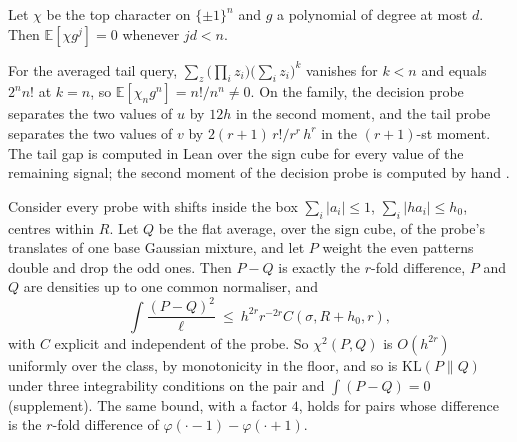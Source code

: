 \begin{theorem}
\label{thm:vanish}
Let $\chi$ be the top character on $\{\pm1\}^{n}$ and $g$ a polynomial of degree at most $d$.
Then $\mathbb{E}[\chi g^{j}]=0$ whenever $jd<n$.
\end{theorem}


\begin{theorem}[Attainment]
\label{thm:attain}
For the averaged tail query, $\sum_{z}\bigl(\prod_{i}z_{i}\bigr)\bigl(\sum_{i}z_{i}\bigr)^{k}$
vanishes for $k<n$ and equals $2^{n}n!$ at $k=n$, so $\mathbb{E}[\chi_{n}g^{n}]=n!/n^{n}\ne0$. On
the family, the decision probe separates the two values of $u$ by $12h$ in the second moment,
and the tail probe separates the two values of $v$ by $2(r+1)\,r!/r^{r}\,h^{r}$ in the
$(r+1)$-st moment. The tail gap is computed in Lean over the sign cube for every value of the
remaining signal; the second moment of the decision probe is computed by hand \CERT.
\end{theorem}


\begin{theorem}
\label{thm:unif}
Consider every probe with shifts inside the box $\sum_{i}|a_{i}|\le1$, $\sum_{i}|ha_{i}|\le h_{0}$,
centres within $R$. Let $Q$ be the flat average, over the sign cube, of the probe's translates
of one base Gaussian mixture, and let $P$ weight the even patterns double and drop the odd
ones. Then $P-Q$ is exactly the $r$-fold difference, $P$ and $Q$ are densities up to one common
normaliser, and
\[
\int\frac{(P-Q)^{2}}{\ell}\ \le\ h^{2r}r^{-2r}C(\sigma,R+h_{0},r),
\]
with $C$ explicit and independent of the probe. So $\chi^{2}(P,Q)$ is $O(h^{2r})$ uniformly over
the class, by monotonicity in the floor, and so is $\mathrm{KL}(P\|Q)$ under three integrability
conditions on the pair and $\int(P-Q)=0$ (supplement). The same bound, with a factor $4$, holds for pairs whose
difference is the $r$-fold difference of $\varphi(\cdot-1)-\varphi(\cdot+1)$.
\end{theorem}


